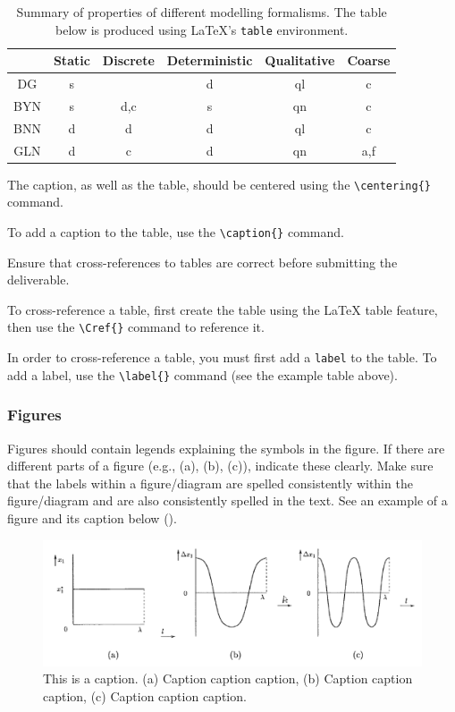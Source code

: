 \begin{table}[htb]
	\centering
	\caption{Summary of properties of different modelling formalisms. The table below is produced using \LaTeX's {\tt table} environment.}
	\label{tab:latextable}
	\begin{tabular}{cccccc}
		\hline
		\rowcolor{gray!30} %
		& Static & Discrete & Deterministic & Qualitative & Coarse \\
	    \hline
	    DG & s &  & d & ql & c \\
	    BYN & s & d,c & s & qn & c\\
	    BNN & d & d & d & ql & c\\
	    GLN & d & c & d & qn & a,f\\
		\hline
	\end{tabular}
\end{table}

The caption, as well as the table, should be centered using the \texttt{\textbackslash centering\{\}} command.

To add a caption to the table, use the \texttt{\textbackslash caption\{\}} command. 

Ensure that cross-references to tables are correct before submitting the deliverable. 

To cross-reference a table, first create the table using the LaTeX table feature, then use the \texttt{\textbackslash Cref\{\}} command to reference it.

In order to cross-reference a table, you must first add a \texttt{label} to the table. To add a label, use the \texttt{\textbackslash label\{\}} command (see the example table above).

\subsubsection{Figures}
\label{sec:figures}

Figures should contain legends explaining the symbols in the figure. If there are different parts of a figure (e.g., (a), (b), (c)), indicate these clearly. Make sure that the labels within a figure/diagram are spelled consistently within the figure/diagram and are also consistently spelled in the text. See an example of a figure and its caption below ().

\begin{figure}[htb]
	\centering
	\includegraphics[width=.89\linewidth]{graphics/figure}
	\caption{This is a caption. (a) Caption caption caption, (b) Caption caption caption, (c) Caption caption caption.}
	\label{fig:figure}
\end{figure}

